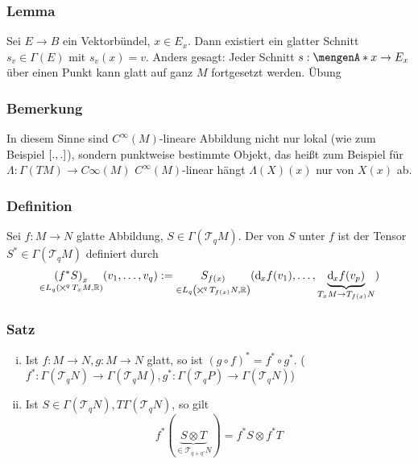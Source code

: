 \subsubsection{Lemma}
\label{ssub:179}
Sei $E\to B$ ein Vektorbündel, $x\in E_x$. Dann existiert ein glatter Schnitt $s_v\in \Gamma(E)$ mit $s_v(x) = v$. Anders gesagt: Jeder Schnitt $s:\set{x}\to E_x$ über einen Punkt kann glatt auf ganz $M$ fortgesetzt werden.
Übung

\subsubsection{Bemerkung}
\label{ssub:180}
In diesem Sinne sind $C^\infty (M)$-lineare Abbildung nicht nur lokal (wie zum Beispiel $\benbrace{.,.}$), sondern punktweise bestimmte Objekt, das heißt zum Beispiel für $\Lambda:\Gamma(TM)\to C\infty(M)$ $C^\infty(M)$-linear hängt $\Lambda(X)(x)$ nur von $X(x)$ ab.

\subsubsection{Definition}
\label{ssub:181}
Sei $f:M\to N$ glatte Abbildung, $S\in \Gamma(\mathcal{T}_q M)$. Der  von $S$ unter $f$ ist der Tensor $S^* \in \Gamma(\mathcal{T}_q M)$ definiert durch
\[
\underset{\in L_q \enbrace*{\bigtimes^q T_x M,\mathds{R}}}{\enbrace*{f^* S}_x} \enbrace{v_1,\ldots,v_q} := \underset{\in L_q \enbrace*{\bigtimes^q T_{f(x)} N,\mathds{R}}}{S_{f(x)}} \enbrace{\mathd_x f(v_1),\ldots,\underbrace{\mathd_x f(v_p)}_{T_x M \to T_{f(x)} N}}
\]

\subsubsection[Satz:Funktionelle Eigenschaften]{Satz}
\label{ssub:182}
\begin{enumerate}[(i)]
\item Ist $f:M\to N,g:M\to N$ glatt, so ist $(g\circ f)^* = f^*\circ g^*$. ($f^*:\Gamma(\mathcal{T}_q N)\to \Gamma(\mathcal{T}_q M),g^*:\Gamma(\mathcal{T}_q P)\to \Gamma(\mathcal{T}_q N)$)
\item Ist $S\in \Gamma(\mathcal{T}_q N), T\Gamma(\mathcal{T}_q N)$, so gilt
\[
f^*(\underbrace{S\otimes T}_{\in \mathcal{T}_{q+q'} N}) = f^* S \otimes f^* T
\]
\end{enumerate}

